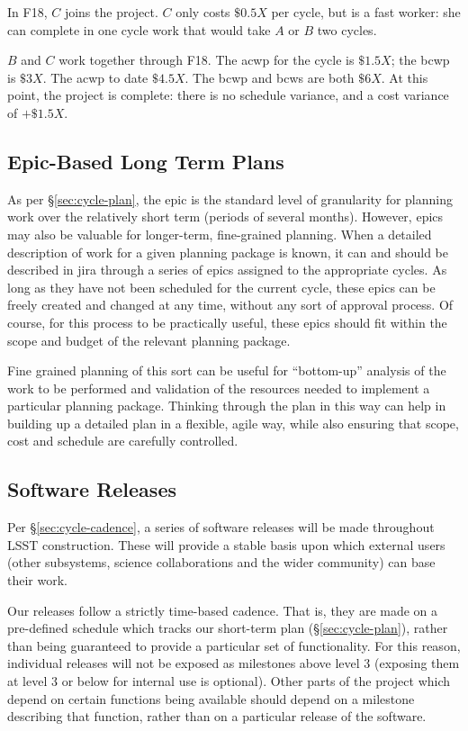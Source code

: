 In F18, \(C\) joins the project.
\(C\) only costs \(\$0.5X\) per \gls{cycle}, but is a fast worker: she can complete in one \gls{cycle} work that would take \(A\) or \(B\) two \glspl{cycle}.

\(B\) and \(C\) work together through F18.
The \gls{acwp} for the \gls{cycle} is \(\$1.5X\); the \gls{bcwp} is \(\$3X\). The \gls{acwp} to date \(\$4.5X\).
The \gls{bcwp} and \gls{bcws} are both \(\$6X\).
At this point, the project is complete: there is no schedule variance, and a cost variance of \(+\$1.5X\).

\subsection{Epic-Based Long Term Plans}

As per \S\ref{sec:cycle-plan}, the \gls{epic} is the standard level of granularity for planning work over the relatively short term (periods of several months).
However, \glspl{epic} may also be valuable for longer-term, fine-grained planning.
When a detailed description of work for a given planning package is known, it can and should be described in \gls{jira} through a series of \glspl{epic} assigned to the appropriate \glspl{cycle}.
As long as they have not been scheduled for the current \gls{cycle}, these \glspl{epic} can be freely created and changed at any time, without any sort of approval process.
Of course, for this process to be practically useful, these \glspl{epic} should fit within the scope and budget of the relevant planning package.

Fine grained planning of this sort can be useful for ``bottom-up''
analysis of the work to be performed and validation of the resources
needed to implement a particular planning package. Thinking through the
plan in this way can help in building up a detailed plan in a flexible,
agile way, while also ensuring that scope, cost and schedule are
carefully controlled.

\subsection{Software Releases}
\label{sec:releases}

Per \S\ref{sec:cycle-cadence}, a series of software releases will be made
throughout LSST construction. These will provide a stable basis upon
which external users (other subsystems, science collaborations and the
wider community) can base their work.

Our releases follow a strictly time-based cadence. That is, they are
made on a pre-defined schedule which tracks our
short-term plan (\S\ref{sec:cycle-plan}), rather than
being guaranteed to provide a particular set of functionality. For this
reason, individual releases will not be exposed as milestones above
level 3 (exposing them at level 3 or below for internal use is
optional). Other parts of the project which depend on certain functions
being available should depend on a milestone describing that function,
rather than on a particular release of the software.

